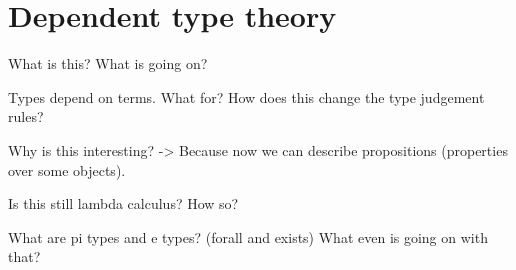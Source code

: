 \chapter{Dependent type theory}

What is this? What is going on?

Types depend on terms. What for? How does this change the type judgement rules?

Why is this interesting? -> Because now we can describe propositions (properties over some objects).

Is this still lambda calculus? How so?

What are pi types and e types? (forall and exists) What even is going on with that?

